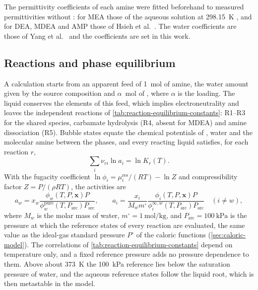 The permittivity coefficients of each amine were fitted beforehand to measured permittivities without \COtwo: for MEA those of the aqueous solution at \SI{298.15}{\kelvin} \cite{agieienkoWhatGasStream2024a}, and for DEA, MDEA and AMP those of Hsieh et al.\ \cite{hsiehDielectricConstantsAqueous2007}.
The water coefficients are those of Yang et al.\ \cite{Yang2024} and the \COtwo coefficients are set in this work.

\subsection{Reactions and phase equilibrium}\label{sec:reactions}
A calculation starts from an apparent feed of \SI{1}{\mole} of amine, the water amount given by the source composition and \(\alpha\)~\si{\mole} of \COtwo, where \(\alpha\) is the loading.
The liquid conserves the elements of this feed, which implies electroneutrality and leaves the independent reactions of \cref{tab:reaction-equilibrium-constants}: R1--R3 for the shared species, carbamate hydrolysis (R4, absent for MDEA) and amine dissociation (R5).
Bubble states equate the chemical potentials of \COtwo, water and the molecular amine between the phases, and every reacting liquid satisfies, for each reaction \(r\),
\begin{equation}
    \sum_i\nu_{ri}\ln a_i=\ln K_r(T).
    \label{eq:activity-reaction-equilibrium}
\end{equation}
With the fugacity coefficient $\ln\phi_i=\mu_i^{\mathrm{res}}/(RT)-\ln Z$ and compressibility factor $Z=P/(\rho RT)$, the activities are
\begin{equation}
 a_w=x_w\frac{\phi_w(T,P,\boldsymbol x)P}{\phi_w^{\mathrm{pure}}(T,P_{\mathrm{src}})P_{\mathrm{src}}},\qquad
 a_i=\frac{x_i}{M_wm^\circ}\frac{\phi_i(T,P,\boldsymbol x)P}{\phi_i^{\infty,w}(T,P_{\mathrm{src}})P_{\mathrm{src}}}\quad(i\ne w),
 \label{eq:activities}
\end{equation}
where $M_w$ is the molar mass of water, $m^\circ=\SI{1}{\mole\per\kilogram}$, and $P_{\mathrm{src}}=\SI{100}{\kilo\pascal}$ is the pressure at which the reference states of every reaction are evaluated, the same value as the ideal-gas standard pressure $P^\circ$ of the caloric functions (\cref{sec:caloric-model}).
The correlations of \cref{tab:reaction-equilibrium-constants} depend on temperature only, and a fixed reference pressure adds no pressure dependence to them.
Above about \SI{373}{\kelvin} the \SI{100}{\kilo\pascal} reference lies below the saturation pressure of water, and the aqueous reference states follow the liquid root, which is then metastable in the model.
